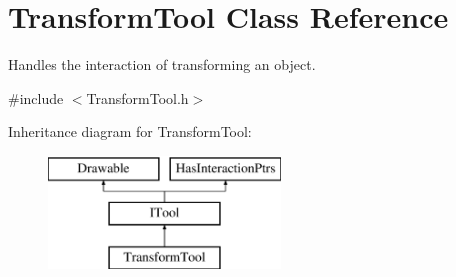 \hypertarget{class_transform_tool}{}\section{Transform\+Tool Class Reference}
\label{class_transform_tool}


Handles the interaction of transforming an object.  




{\ttfamily \#include $<$Transform\+Tool.\+h$>$}

Inheritance diagram for Transform\+Tool\+:\begin{figure}[H]
\begin{center}
\leavevmode
\includegraphics[height=3.000000cm]{class_transform_tool}
\end{center}
\end{figure}
